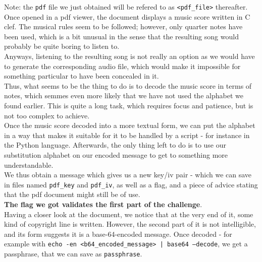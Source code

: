 \documentclass[12pt,a4paper]{article}
\begin{document}
    Note: the \texttt{pdf} file we just obtained will be refered to as \texttt{<pdf\_file>} thereafter.\\

    Once opened in a pdf viewer, the document displays a music score written in
    C clef. The musical rules seem to be followed; however, only quarter notes
    have been used, which is a bit unusual in the sense that the resulting song
    would probably be quite boring to listen to.\\

    Anyways, listening to the resulting song is not really an option as we
    would have to generate the corresponding audio file, which would make it
    impossible for something particular to have been concealed in it.\\

    Thus, what seems to be the thing to do is to decode the music score in
    terms of notes, which semmes even more likely that we have not used the
    alphabet we found earlier. This is quite a long task, which requires focus
    and patience, but is not too complex to achieve.\\

    Once the music score decoded into a more textual form, we can put the
    alphabet in a way that makes it suitable for it to be handled by a script -
    for instance in the Python language. Afterwards, the only thing left to do
    is to use our substitution alphabet on our encoded message to get to
    something more understandable.\\

    We thus obtain a message which gives us a new key/iv pair - which we can
    save in files named \texttt{pdf\_key} and \texttt{pdf\_iv}, as well as a
    flag, and a piece of advice stating that the pdf document might still be of
    use.\\

    \textbf{The flag we got validates the first part of the challenge}.\\

    Having a closer look at the document, we notice that at the very end of it,
    some kind of copyright line is written. However, the second part of it is
    not intelligible, and its form suggests it is a base-64-encoded message.
    Once decoded - for example with \texttt{echo -en <b64\_encoded\_message> |
    base64 --decode}, we get a passphrase, that we can save as
    \texttt{passphrase}.\\
\end{document}
